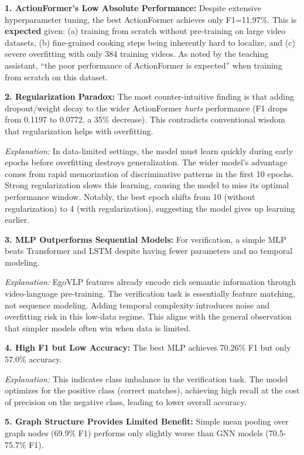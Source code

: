 \documentclass[10pt,twocolumn,letterpaper]{article}
\begin{document}
\textbf{1. ActionFormer's Low Absolute Performance:} Despite extensive hyperparameter tuning, the best ActionFormer achieves only F1=11.97\%. This is \textbf{expected} given: (a) training from scratch without pre-training on large video datasets, (b) fine-grained cooking steps being inherently hard to localize, and (c) severe overfitting with only 384 training videos. As noted by the teaching assistant, ``the poor performance of ActionFormer is expected'' when training from scratch on this dataset.

\textbf{2. Regularization Paradox:} The most counter-intuitive finding is that adding dropout/weight decay to the wider ActionFormer \textit{hurts} performance (F1 drops from 0.1197 to 0.0772, a 35\% decrease). This contradicts conventional wisdom that regularization helps with overfitting.

\textit{Explanation:} In data-limited settings, the model must learn quickly during early epochs before overfitting destroys generalization. The wider model's advantage comes from rapid memorization of discriminative patterns in the first 10 epochs. Strong regularization slows this learning, causing the model to miss its optimal performance window. Notably, the best epoch shifts from 10 (without regularization) to 4 (with regularization), suggesting the model gives up learning earlier.

\textbf{3. MLP Outperforms Sequential Models:} For verification, a simple MLP beats Transformer and LSTM despite having fewer parameters and no temporal modeling.

\textit{Explanation:} EgoVLP features already encode rich semantic information through video-language pre-training. The verification task is essentially feature matching, not sequence modeling. Adding temporal complexity introduces noise and overfitting risk in this low-data regime. This aligns with the general observation that simpler models often win when data is limited.

\textbf{4. High F1 but Low Accuracy:} The best MLP achieves 70.26\% F1 but only 57.0\% accuracy.

\textit{Explanation:} This indicates class imbalance in the verification task. The model optimizes for the positive class (correct matches), achieving high recall at the cost of precision on the negative class, leading to lower overall accuracy.

\textbf{5. Graph Structure Provides Limited Benefit:} Simple mean pooling over graph nodes (69.9\% F1) performs only slightly worse than GNN models (70.5-75.7\% F1).
\end{document}
